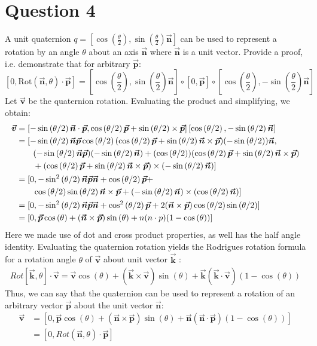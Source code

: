 \documentclass[letterpaper, 11pt]{article}
\newcommand{\vect}[1]{\boldsymbol{\vec #1}}
\newcommand{\rp}[2]{\left[#1,#2\right]}
\renewcommand{\sin}[1]{\operatorname{sin}\left( #1 \right)}
\renewcommand{\cos}[1]{\operatorname{cos}\left( #1 \right)}
\newcommand{\sinsq}[1]{\operatorname{sin}^2\left( #1 \right)}
\newcommand{\cossq}[1]{\operatorname{cos}^2\left( #1 \right)}
\begin{document}
\section*{Question 4}
A unit quaternion $q=\rp{\cos{\frac{\theta}{2}}}{\sin{\frac{\theta}{2}}\vect{n}}$ can be used to represent a rotation by an angle $\theta$ about an axis $\vect n$ where $\vect n$ is a unit vector. Provide a proof, i.e. demonstrate that for arbitrary $\vect p$:
$$\rp{0}{\mathrm{Rot}(\vect n, \theta) \cdot \vect p}=\rp{\cos{\frac{\theta}{2}}}{\sin{\frac{\theta}{2}}\vect n} \circ \rp{0}{\vect p} \circ \rp{\cos{\frac{\theta}{2}}}{-\sin{\frac{\theta}{2}}\vect n}$$
Let $\vect v$ be the quaternion rotation. Evaluating the product and simplifying, we obtain:
\begin{align}
\vect v &= \rp{-\sin{\theta/2} \vect n \cdot \vect p}{\cos{\theta/2} \vect p + \sin{\theta/2} \times \vect p} \rp{\cos{\theta/2}}{-\sin{\theta/2}\vect n} \\
&= [-\sin{\theta/2}\vect n \vect p \cos{\theta/2}(\cos{\theta/2}\vect p  + \sin{\theta/2}\vect n \times \vect p)(-\sin{\theta/2})\vect n,\notag \\ 
    & \qquad (-\sin{\theta/2}\vect n \vect p)(-\sin{\theta/2}\vect n) + (\cos{\theta/2})(\cos{\theta/2}\vect p + \sin{\theta/2} \vect n \times \vect p) \notag \\ 
    & \qquad + (\cos{\theta/2}\vect p + \sin{\theta/2}\vect n \times \vect p)\times (-\sin{\theta/2}\vect n)] \\
    &= [0,-\sinsq{\theta/2}\vect n \vect p \vect n + \cos{\theta/2} \vect p + \notag \\ 
    & \qquad \cos{\theta/2}\sin{\theta/2}\vect n \times \vect p + (-\sin{\theta/2}\vect n)\times(\cos{\theta/2}\vect n)] \\
    &= [0, -\sinsq{\theta/2} \vect n \vect p \vect n + \cossq{\theta/2}\vect p + 2(\vect n \times \vect p)\cos{\theta/2}\sin{\theta/2}] \\
    &= [0, \vect p \cos{\theta} + (\vect n \times \vect p) \sin{\theta} + n(n \cdot p)(1- \cos{\theta})]
\end{align}
Here we made use of dot and cross product properties, as well has the half angle identity. Evaluating the quaternion rotation yields the Rodrigues rotation formula for a rotation angle $\theta$ of $\vect v$ about unit vector $\vect k$ :
\begin{align}
Rot[\vect k, \theta] \cdot \vect v = \vect v \cos{\theta} + (\vect k \times \vect v) \sin{\theta} + \vect k(\vect k \cdot \vect v)(1-\cos{\theta})
\end{align}
Thus, we can say that the quaternion can be used to represent a rotation of an arbitrary vector $\vect p$ about the unit vector $\vect n$:
\begin{align}
\vect v &= [0, \vect p \cos{\theta} + (\vect n \times \vect p) \sin{\theta} + \vect n(\vect n \cdot \vect p)(1- \cos{\theta})] \\
&= \rp{0}{Rot(\vect n, \theta) \cdot \vect p}
\end{align}
\end{document}
